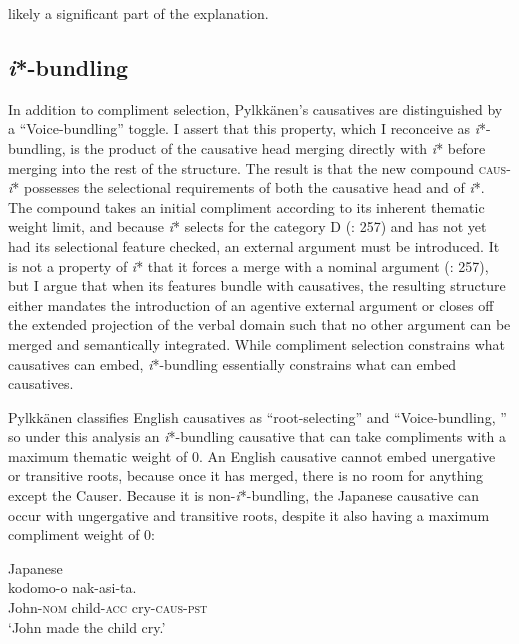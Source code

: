 \documentclass[output=paper,modfonts,nonflat,colorlinks,citecolor=brown]{langsci/langscibook}
\begin{document}
likely a significant part of the explanation.\\

\subsection{\textit{i}*-bundling}\label{sec:wechsler:2.4}

In addition to compliment selection, Pylkkänen’s causatives are distinguished by a “Voice-bundling” toggle. I assert that this property, which I reconceive as \textit{i}*-bundling, is the product of the causative head merging directly with \textit{i}* before merging into the rest of the structure. The result is that the new compound \textsc{caus}{}-\textit{i}* possesses the selectional requirements of both the causative head and of \textit{i}*. The compound takes an initial compliment according to its inherent thematic weight limit, and because \textit{i}* selects for the category D (\citealt{WoodMarantz2017}: 257) and has not yet had its selectional feature checked, an external argument must be introduced. It is not a property of \textit{i}* that it forces a merge with a nominal argument (\citealt{WoodMarantz2017}: 257), but I argue that when its features bundle with causatives, the resulting structure either mandates the introduction of an agentive external argument or closes off the extended projection of the verbal domain such that no other argument can be merged and semantically integrated. While compliment selection constrains what causatives can embed, \textit{i}*-bundling essentially constrains what can embed causatives. 



Pylkkänen classifies English causatives as “root-selecting” and “Voice-bundling, ” so under this analysis an \textit{i}*-bundling causative that can take compliments with a maximum thematic weight of 0. An English causative cannot embed unergative or transitive roots, because once it has merged, there is no room for anything except the Causer. Because it is non-\textit{i}*-bundling, the Japanese causative can occur with ungergative and transitive roots, despite it also having a maximum compliment weight of 0: 


\ea\label{ex:wechsler:11}
Japanese \citep[120]{Pylkkänen2008}\\
 {kodomo-o} {nak-asi-ta}.\\
John-\textsc{nom}  child-\textsc{acc}  cry-\textsc{caus-pst}\\
\glt ‘John made the child cry.'
\z
\end{document}
